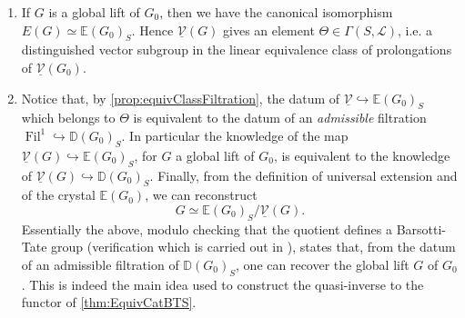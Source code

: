 \begin{rem}[]
\begin{enumerate}
	\item If $G$ is a global lift of $G_0$, then we have the canonical isomorphism
		$E(G) \simeq \mathbb{E}(G_0)_S$.
		Hence $\underline{\mathcal{V}}(G)$ gives an element $\Theta \in \Gamma(S,\mathscr{L})$,
		i.e. a distinguished vector subgroup in the linear equivalence
		class of prolongations of $\underline{\mathcal{V}}(G_0)$.

	\item Notice that, by \cref{prop:equivClassFiltration}, the datum of 
		$\underline{\mathcal{V}} \hookrightarrow \mathbb{E}(G_0)_S$
		which belongs to $\Theta$ is
		equivalent to the datum of an \emph{admissible} filtration
		$\operatorname{Fil}^1 \hookrightarrow \mathbb{D}(G_0)_S$.
		In particular the knowledge of the map
		$\underline{\mathcal{V}}(G) \hookrightarrow \mathbb{E}(G_0)_S$, for $G$ a global
		lift of $G_0$, is equivalent to the knowledge of
		$\underline{\mathcal{V}}(G) \hookrightarrow \mathbb{D}(G_0)_S$.
		Finally, from the definition of universal extension
		and of the crystal $\mathbb{E}(G_0)$, we can reconstruct 
		\begin{equation*}
			G \simeq \mathbb{E}(G_0)_S/\underline{\mathcal{V}}(G)
		.\end{equation*}
		Essentially the above, modulo checking that the quotient defines
		a Barsotti-Tate group (verification which is carried out in
		\cite[Chapter V, theorem 1.6]{Messing}), states that, from 
		the datum of an admissible filtration of $\mathbb{D}(G_0)_S$,
		one can recover the global lift $G$ of $G_0$.
		This is indeed the main idea used to construct the quasi-inverse
		to the functor of \cref{thm:EquivCatBTS}.
\end{enumerate}
\end{rem}
